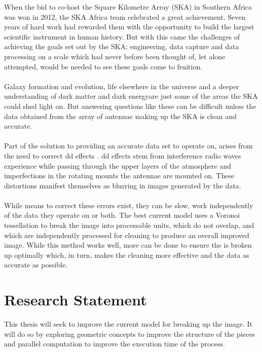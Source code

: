 When the bid to co-host the Square Kilometre Array (SKA) in Southern Africa was won in 2012, the SKA Africa team celebrated a great achievement. Seven years of hard work had rewarded them with the opportunity to build the largest scientific instrument in human history. But with this came the challenges of achieving the goals set out by the SKA; engineering, data capture and data processing on a scale which had never before been thought of, let alone attempted, would be needed to see these goals come to fruition.
\\
\\
Galaxy formation and evolution, life elsewhere in the universe and a deeper understanding of dark matter and dark energy\footnotemark are just some of the areas the SKA could shed light on. But answering questions like these can be difficult unless the data obtained from the array of antennae making up the SKA is clean and accurate.
\\
\\
Part of the solution to providing an accurate data set to operate on, arises from the need to correct \gls{dd} effects \citep{smirnov2011revisiting}. \gls{dd} effects stem from interference radio waves experience while passing through the upper layers of the atmosphere and imperfections in the rotating mounts the antennae are mounted on. These distortions manifest themselves as blurring in images generated by the data.
\\
\\
While means to correct these errors exist, they can be slow, work independently of the data they operate on or both. The best current model uses a Voronoi tessellation \citep{okabe2009spatial} to break the image into processable units, which do not overlap, and which are independently processed for cleaning to produce an overall improved image. While this method works well, more can be done to ensure the is broken up optimally which, in turn, makes the cleaning more effective and the data as accurate as possible.
\section{Research Statement}
This thesis will seek to improve the current model for breaking up the image. It will do so by exploring geometric concepts to improve the structure of the pieces and parallel computation to improve the execution time of the process.
